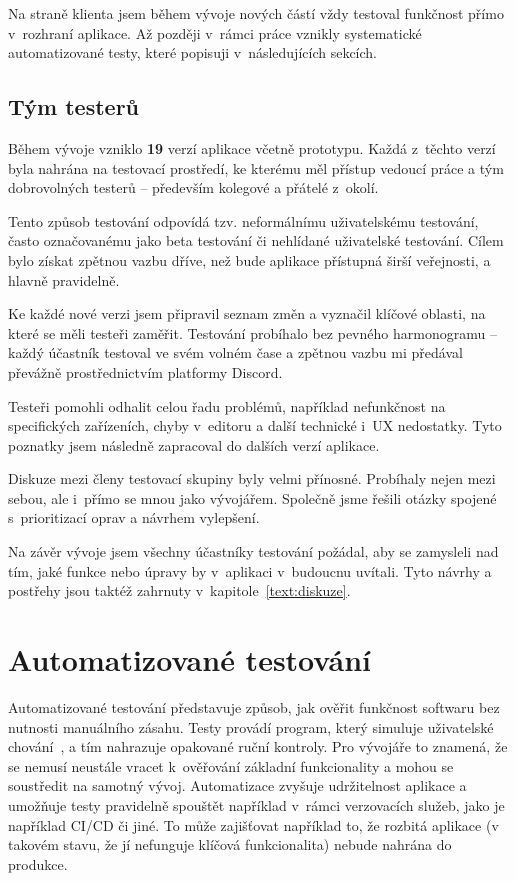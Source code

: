 Na straně klienta jsem během vývoje nových částí vždy testoval funkčnost přímo v~rozhraní aplikace.
Až později v~rámci práce vznikly systematické automatizované testy, které popisuji v~následujících sekcích.

\subsection{Tým testerů}

Během vývoje vzniklo \textbf{19} verzí aplikace včetně prototypu. 
Každá z~těchto verzí byla nahrána na testovací prostředí, ke kterému měl přístup vedoucí práce a tým dobrovolných testerů -- především kolegové a přátelé z~okolí.

Tento způsob testování odpovídá tzv. neformálnímu uživatelskému testování, často označovanému jako beta testování či nehlídané uživatelské testování. 
Cílem bylo získat zpětnou vazbu dříve, než bude aplikace přístupná širší veřejnosti, a hlavně pravidelně.

Ke každé nové verzi jsem připravil seznam změn a vyznačil klíčové oblasti, na které se měli testeři zaměřit. 
Testování probíhalo bez pevného harmonogramu -- každý účastník testoval ve svém volném čase a zpětnou vazbu mi předával převážně prostřednictvím platformy Discord.

Testeři pomohli odhalit celou řadu problémů, například nefunkčnost na specifických zařízeních, chyby v~editoru a další technické i~UX nedostatky. 
Tyto poznatky jsem následně zapracoval do dalších verzí aplikace.

Diskuze mezi členy testovací skupiny byly velmi přínosné.
Probíhaly nejen mezi sebou, ale i~přímo se mnou jako vývojářem. 
Společně jsme řešili otázky spojené s~prioritizací oprav a návrhem vylepšení.

Na závěr vývoje jsem všechny účastníky testování požádal, aby se zamysleli nad tím, jaké funkce nebo úpravy by v~aplikaci v~budoucnu uvítali. 
Tyto návrhy a postřehy jsou taktéž zahrnuty v~kapitole~\ref{text:diskuze}.

\section{Automatizované testování}

Automatizované testování představuje způsob, jak ověřit funkčnost softwaru bez nutnosti manuálního zásahu.
Testy provádí program, který simuluje uživatelské chování~\cite{meszaros_2007}, a tím nahrazuje opakované ruční kontroly.
Pro vývojáře to znamená, že se nemusí neustále vracet k~ověřování základní funkcionality a mohou se soustředit na samotný vývoj. 
Automatizace zvyšuje udržitelnost aplikace a umožňuje testy pravidelně spouštět například v~rámci verzovacích služeb, jako je například CI/CD či jiné.
To může zajišťovat například to, že rozbitá aplikace (v takovém stavu, že jí nefunguje klíčová funkcionalita) nebude nahrána do produkce.

